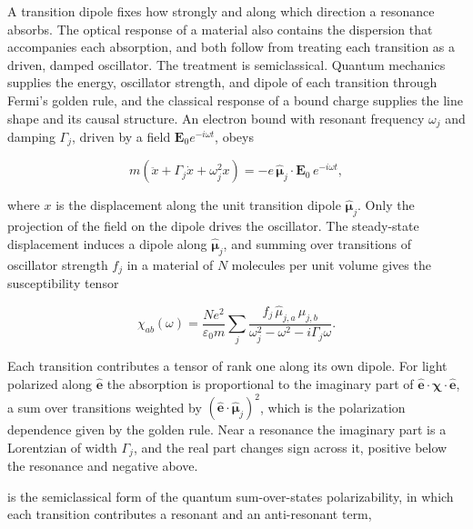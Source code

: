 A transition dipole fixes how strongly and along which direction a resonance absorbs. The optical response of a material also contains the dispersion that accompanies each absorption, and both follow from treating each transition as a driven, damped oscillator. The treatment is semiclassical. Quantum mechanics supplies the energy, oscillator strength, and dipole of each transition through Fermi's golden rule, and the classical response of a bound charge supplies the line shape and its causal structure.\autocite{als-nielsenElementsModernXray2011,jacksonClassicalElectrodynamics2009,kuzykNonlinearOpticsStudents2017} An electron bound with resonant frequency \(\omega_{j}\) and damping \(\Gamma_{j}\), driven by a field \(\mathbf{E}_{0}e^{- i\omega t}\), obeys

\begin{equation}
  m\left( \ddot{x} + \Gamma_{j}\dot{x} + \omega_{j}^{2}x \right) = - e\,{\widehat{\mathbf{\mu}}}_{j} \cdot \mathbf{E}_{0}\, e^{- i\omega t},
  \label{eq:oscillator}
\end{equation}

where \(x\) is the displacement along the unit transition dipole \({\widehat{\mathbf{\mu}}}_{j}\). Only the projection of the field on the dipole drives the oscillator. The steady-state displacement induces a dipole along \({\widehat{\mathbf{\mu}}}_{j}\), and summing over transitions of oscillator strength \(f_{j}\) in a material of \(N\) molecules per unit volume gives the susceptibility tensor

\begin{equation}
  \chi_{ab}(\omega) = \frac{Ne^{2}}{\varepsilon_{0}m}\sum_{j}\frac{f_{j}\,{\widehat{\mu}}_{j,a}\,{\widehat{\mu}}_{j,b}}{\omega_{j}^{2} - \omega^{2} - i\Gamma_{j}\omega}.
  \label{eq:susceptibility}
\end{equation}

Each transition contributes a tensor of rank one along its own dipole. For light polarized along \(\widehat{\mathbf{e}}\) the absorption is proportional to the imaginary part of \(\widehat{\mathbf{e}} \cdot \mathbf{\chi} \cdot \widehat{\mathbf{e}}\), a sum over transitions weighted by \(\left( \widehat{\mathbf{e}} \cdot {\widehat{\mathbf{\mu}}}_{j} \right)^{2}\), which is the polarization dependence given by the golden rule. Near a resonance the imaginary part is a Lorentzian of width \(\Gamma_{j}\), and the real part changes sign across it, positive below the resonance and negative above.

 is the semiclassical form of the quantum sum-over-states polarizability, in which each transition contributes a resonant and an anti-resonant term,

